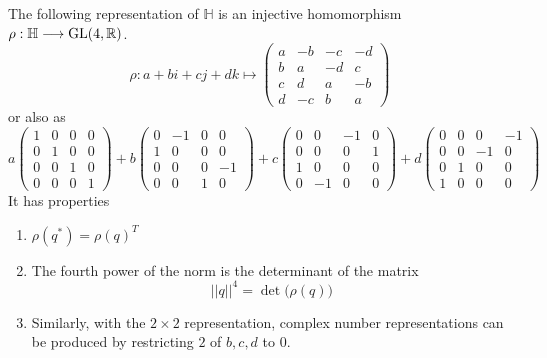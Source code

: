   \begin{theorem}
  The following representation of $\mathbb{H}$ is an injective homomorphism $\rho: \mathbb{H} \longrightarrow \operatorname{GL}(4, \mathbb{R})$. 
  \begin{equation}
    \rho: a+bi+cj+dk \mapsto \begin{pmatrix}
    a&-b&-c&-d \\
    b&a&-d&c\\
    c&d&a&-b\\
    d&-c&b&a
    \end{pmatrix}
  \end{equation}
  or also as
  \begin{equation}
    a \begin{pmatrix}
    1 &0 &0 &0 \\
    0& 1&0&0\\
    0&0&1&0\\
    0&0&0&1
    \end{pmatrix} + b \begin{pmatrix}
    0&-1&0&0\\1&0&0&0\\0&0&0&-1\\0&0&1&0
    \end{pmatrix} + c\begin{pmatrix}
    0&0&-1&0\\0&0&0&1\\1&0&0&0\\0&-1&0&0
    \end{pmatrix} + d \begin{pmatrix}
    0&0&0&-1\\0&0&-1&0\\0&1&0&0\\1&0&0&0
    \end{pmatrix}
  \end{equation}
  It has properties
  \begin{enumerate}
    \item $\rho(q^*) = \rho(q)^T$
    \item The fourth power of the norm is the determinant of the matrix 
      \begin{equation}
        ||q||^4 = \det\big( \rho (q)\big)
      \end{equation}
    \item Similarly, with the $2\times 2$ representation, complex number representations can be produced by restricting $2$ of $b, c, d$ to $0$. 
  \end{enumerate}
  \end{theorem}

